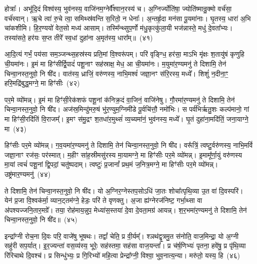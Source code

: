 होत्राः᳚। अभू॑दि॒दं विश्व॑स्य॒ भुव॑नस्य॒ वाजि॑नम॒ग्नेर्वै᳚श्वान॒रस्य॑ च। अ॒ग्निर्ज्योति॑षा॒ ज्योति॑ष्मान्रु॒क्मो वर्च॑सा॒ वर्च॑स्वान्। ऋ॒चे त्वा॑ रु॒चे त्वा॒ समिथ्स्र॑वन्ति स॒रितो॒ न धेनाः᳚। अ॒न्तर्\mbox{}हृ॒दा मन॑सा पू॒यमा॑नाः। घृ॒तस्य॒ धारा॑ अ॒भि चा॑कशीमि। हि॒र॒ण्ययो॑ वेत॒सो मध्य॑ आसाम्। तस्मि᳚न्थ्सुप॒र्णो म॑धु॒कृत्कु॑ला॒यी भज॑न्नास्ते॒ मधु॑ दे॒वता᳚भ्यः। तस्या॑सते॒ हर॑यः स॒प्त तीरे᳚ स्व॒धां दुहा॑ना अ॒मृत॑स्य॒ धारा᳚म्॥~(४१)

{\anuvakamend[{प्र॒ति॒ष्ठायै॑ स॒हस्र॑वीर्या पर॒मं वि॒राट्थ्स॒प्त तीरे॑ च॒त्वारि॑ च}]}%

आ॒दि॒त्यं गर्भं॒ पय॑सा सम॒ञ्जन्थ्स॒हस्र॑स्य प्रति॒मां वि॒श्वरू॑पम्। परि॑ वृङ्ग्धि॒ हर॑सा॒ माऽभि मृ॑क्षः श॒तायु॑षं कृणुहि ची॒यमा॑नः। इ॒मं मा हिꣳ॑सीर्द्वि॒पादं॑ पशू॒नाꣳ सह॑स्राक्ष॒ मेध॒ आ ची॒यमा॑नः। म॒युमा॑र॒ण्यमनु॑ ते दिशामि॒ तेन॑ चिन्वा॒नस्त॒नुवो॒ नि षी॑द। वात॑स्य॒ ध्राजिं॒ वरु॑णस्य॒ नाभि॒मश्वं॑ जज्ञा॒नꣳ स॑रि॒रस्य॒ मध्ये᳚। शिशुं॑ न॒दीना॒ꣳ॒ हरि॒मद्रि॑बुद्ध॒मग्ने॒ मा हिꣳ॑सीः~(४२)

पर॒मे व्यो॑मन्न्। इ॒मं मा हिꣳ॑सी॒रेक॑शफं पशू॒नां क॑निक्र॒दं वा॒जिनं॒ वाजि॑नेषु। गौ॒रमा॑र॒ण्यमनु॑ ते दिशामि॒ तेन॑ चिन्वा॒नस्त॒नुवो॒ नि षी॑द। अज॑स्र॒मिन्दु॑मरु॒षं भु॑र॒ण्युम॒ग्निमी॑डे पू॒र्वचि॑त्तौ॒ नमो॑भिः। स पर्व॑भिर्\mbox{}ऋतु॒शः कल्प॑मानो॒ गां मा हिꣳ॑सी॒रदि॑तिं वि॒राजम्᳚। इ॒मꣳ स॑मु॒द्रꣳ श॒तधा॑र॒मुथ्सं॑ व्य॒च्यमा॑नं॒ भुव॑नस्य॒ मध्ये᳚। घृ॒तं दुहा॑ना॒मदि॑तिं॒ जना॒याग्ने॒ मा~(४३)

हिꣳ॑सीः पर॒मे व्यो॑मन्न्। ग॒व॒यमा॑र॒ण्यमनु॑ ते दिशामि॒ तेन॑ चिन्वा॒नस्त॒नुवो॒ नि षी॑द। वरू᳚त्रिं॒ त्वष्टु॒र्वरु॑णस्य॒ नाभि॒मविं॑ जज्ञा॒नाꣳ रज॑सः॒ पर॑स्मात्। म॒हीꣳ सा॑ह॒स्रीमसु॑रस्य मा॒यामग्ने॒ मा हिꣳ॑सीः पर॒मे व्यो॑मन्न्। इ॒मामू᳚र्णा॒युं वरु॑णस्य मा॒यां त्वचं॑ पशू॒नां द्वि॒पदां॒ चतु॑ष्पदाम्। त्वष्टुः॑ प्र॒जानां᳚ प्रथ॒मं ज॒नित्र॒मग्ने॒ मा हिꣳ॑सीः पर॒मे व्यो॑मन्न्। उष्ट्र॑मार॒ण्यमनु॑~(४४)

ते दिशामि॒ तेन॑ चिन्वा॒नस्त॒नुवो॒ नि षी॑द। यो अ॒ग्निर॒ग्नेस्तप॒सो\-ऽधि॑ जा॒तः शोचा᳚त्पृथि॒व्या उ॒त वा॑ दि॒वस्परि॑। येन॑ प्र॒जा वि॒श्वक॑र्मा॒ व्यान॒ट्तम॑ग्ने॒ हेडः॒ परि॑ ते वृणक्तु। अ॒जा ह्य॑ग्नेरज॑निष्ट॒ गर्भा॒थ्सा वा अ॑पश्यज्जनि॒तार॒मग्रे᳚। तया॒ रोह॑माय॒न्नुप॒ मेध्या॑स॒स्तया॑ दे॒वा दे॒वता॒मग्र॑ आयन्न्। श॒र॒भमा॑र॒ण्यमनु॑ ते दिशामि॒ तेन॑ चिन्वा॒नस्त॒नुवो॒ नि षी॑द॥~(४५)

{\anuvakamend[{अग्ने॒ मा हिꣳ॑सी॒रग्ने॒ मोष्ट्र॑मार॒ण्यमनु॑ शर॒भं नव॑ च}]}%

इन्द्रा᳚ग्नी रोच॒ना दि॒वः परि॒ वाजे॑षु भूषथः। तद्वां᳚ चेति॒ प्र वी॒र्यम्᳚। श्ञथ॑द्वृ॒त्रमु॒त स॑नोति॒ वाज॒मिन्द्रा॒ यो अ॒ग्नी सहु॑री सप॒र्यात्। इ॒र॒ज्यन्ता॑ वस॒व्य॑स्य॒ भूरेः॒ सह॑स्तमा॒ सह॑सा वाज॒यन्ता᳚। प्र च॑र्\mbox{}ष॒णिभ्यः॑ पृतना॒ हवे॑षु॒ प्र पृ॑थि॒व्या रि॑रिचाथे दि॒वश्च॑। प्र सिन्धु॑भ्यः॒ प्र गि॒रिभ्यो॑ महि॒त्वा प्रेन्द्रा᳚ग्नी॒ विश्वा॒ भुव॒नात्य॒न्या। मरु॑तो॒ यस्य॒ हि~(४६)

